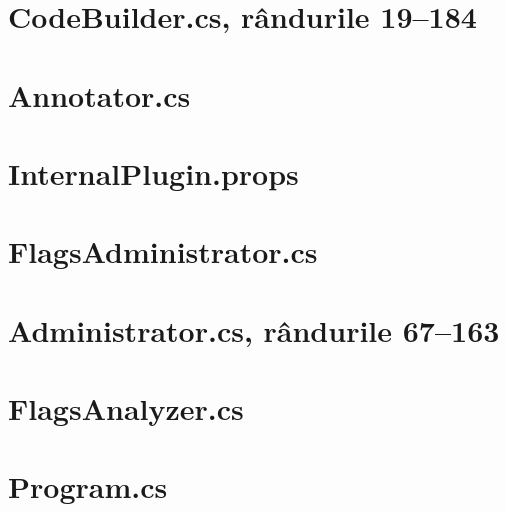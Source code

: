 \documentclass[a4paper,12pt]{report}
\begin{document}
\chapter{CodeBuilder.cs, rândurile 19--184}\label{appendix:Kari____Kari_source_Kari_Utils_CodeBuilder_19_184}


\chapter{Annotator.cs}\label{appendix:Kari____Kari_source_Kari_Annotator_Annotator}


\chapter{InternalPlugin.props}\label{appendix:Kari____Kari_source_Kari_Plugins_InternalPlugin}


\chapter{FlagsAdministrator.cs}\label{appendix:Kari____Kari_source_Kari_Plugins_Flags_FlagsAdministrator}


\chapter{Administrator.cs, rândurile 67--163}\label{appendix:Kari____Kari_source_Kari_GeneratorCore_Workflow_Administrator_67_163}


\chapter{FlagsAnalyzer.cs}\label{appendix:Kari____Kari_source_Kari_Plugins_Flags_FlagsAnalyzer}


\chapter{Program.cs}\label{appendix:uni_thesis____examples_flags_Program}

\end{document}
